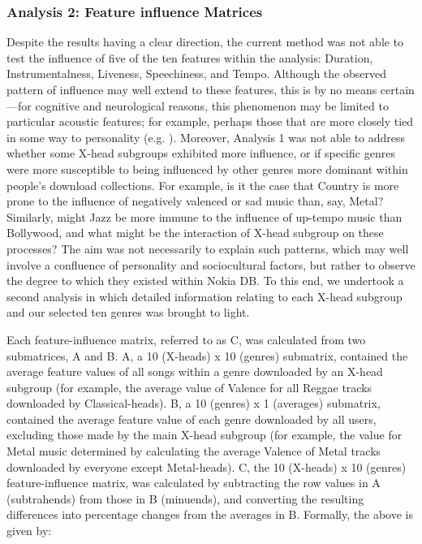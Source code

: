 \documentclass[a4paper]{article}
\begin{document}
\subsubsection{Analysis 2: Feature influence Matrices}\label{sec:leaky_anal_2}
Despite the results having a clear direction, the current method was not able to test the influence of five of the ten features within the analysis: Duration, Instrumentalness, Liveness, Speechiness, and Tempo. Although the observed pattern of influence may well extend to these features, this is by no means certain—for cognitive and neurological reasons, this phenomenon may be limited to particular acoustic features; for example, perhaps those that are more closely tied in some way to personality (e.g. \cite{mccown1997role}). Moreover, Analysis 1 was not able to address whether some X-head subgroups exhibited more influence, or if specific genres were more susceptible to being influenced by other genres more dominant within people’s download collections. For example, is it the case that Country is more prone to the influence of negatively valenced or sad music than, say, Metal? Similarly, might Jazz be more immune to the influence of up-tempo music than Bollywood, and what might be the interaction of X-head subgroup on these processes? The aim was not necessarily to explain such patterns, which may well involve a confluence of personality and sociocultural factors, but rather to observe the degree to which they existed within Nokia DB. To this end, we undertook a second analysis in which detailed information relating to each X-head subgroup and our selected ten genres was brought to light.

Each feature-influence matrix, referred to as C, was calculated from two submatrices, A and B. A, a 10 (X-heads) x 10 (genres) submatrix, contained the average feature values of all songs within a genre downloaded by an X-head subgroup (for example, the average value of Valence for all Reggae tracks downloaded by Classical-heads). B, a 10 (genres) x 1 (averages) submatrix, contained the average feature value of each genre downloaded by all users, excluding those made by the main X-head subgroup (for example, the value for Metal music determined by calculating the average Valence of Metal tracks downloaded by everyone except Metal-heads). C, the 10 (X-heads) x 10 (genres) feature-influence matrix, was calculated by subtracting the row values in A (subtrahends) from those in B (minuends), and converting the resulting differences into percentage changes from the averages in B. Formally, the above is given by: 
\end{document}
